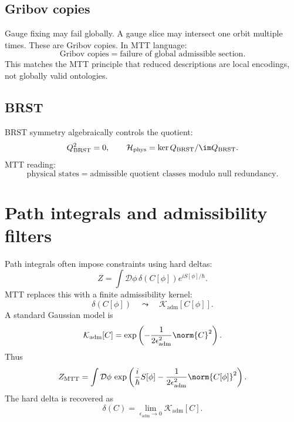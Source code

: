 \documentclass[11pt]{article}
\begin{document}
\subsection{Gribov copies}

Gauge fixing may fail globally. A gauge slice may intersect one orbit multiple times.  These
are Gribov copies. In MTT language:
\[
\boxed{\text{Gribov copies}=\text{failure of global admissible section}.}
\]
This matches the MTT principle that reduced descriptions are local encodings, not globally
valid ontologies.

\subsection{BRST}

BRST symmetry algebraically controls the quotient:
\begin{equation}
Q_{\mathrm{BRST}}^2=0,\qquad
\mathcal H_{\mathrm{phys}}=\ker Q_{\mathrm{BRST}}/\im Q_{\mathrm{BRST}}.
\end{equation}
MTT reading:
\[
\boxed{\text{physical states}=\text{admissible quotient classes modulo null redundancy}.}
\]

\section{Path integrals and admissibility filters}

Path integrals often impose constraints using hard deltas:
\begin{equation}
Z=\int \mathcal D\phi\,\delta(C[\phi])e^{iS[\phi]/\hbar}.
\end{equation}
MTT replaces this with a finite admissibility kernel:
\begin{equation}
\delta(C[\phi])\quad\leadsto\quad \mathcal K_{\mathrm{adm}}[C[\phi]].
\end{equation}
A standard Gaussian model is
\begin{equation}
\mathcal K_{\mathrm{adm}}[C]
=\exp\left(-\frac{1}{2\epsilon_{\mathrm{adm}}^2}\norm{C}^2\right).
\end{equation}
Thus
\begin{equation}
Z_{\mathrm{MTT}}=
\int \mathcal D\phi\,
\exp\left(\frac{i}{\hbar}S[\phi]
-\frac{1}{2\epsilon_{\mathrm{adm}}^2}\norm{C[\phi]}^2\right).
\end{equation}
The hard delta is recovered as
\begin{equation}
\delta(C)=\lim_{\epsilon_{\mathrm{adm}}\to 0}\mathcal K_{\mathrm{adm}}[C].
\end{equation}
\end{document}
